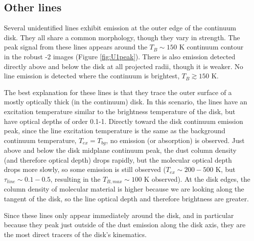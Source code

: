 \documentclass[twocolumn]{aastex61}
\begin{document}
\subsection{Other lines}
\label{sec:otherlines}
Several unidentified lines exhibit emission at the outer edge of the continuum disk.
They all share a common morphology, though they vary in strength.
The peak signal from these lines appears around the $T_B\sim150$ K continuum contour
in the robust -2 images
(Figure \ref{fig:U1peak}).
There is also emission detected directly above and below the disk at all projected
radii, though it is weaker.  No line emission is detected where the continuum is
brightest, $T_B\gtrsim150$ K.

The best explanation for these lines is that they trace the outer surface of a
mostly optically thick (in the continuum) disk.  In this scenario,
the lines have an excitation temperature similar to the brightness temperature
of the disk, but have optical depths of order 0.1-1.  
Directly toward the disk
continuum emission peak, since
the line excitation temperature is the same as the background continuum temperature,
$T_{ex}=T_{bg}$, no emission (or absorption) is observed.  Just above and below
the disk midplane continuum peak, the dust column density (and therefore
optical depth) drops rapidly, but the molecular optical depth drops more
slowly, so some emission is still
observed ($T_{ex}\sim200-500$ K, but $\tau_{line}\sim0.1-0.5$, resulting in 
the $T_{B,max} \sim 100$ K observed).  At the disk edges, the column density of
molecular material is higher because we are looking along the tangent of the
disk, so the line optical depth and therefore brightness are greater.

Since these lines only appear immediately around the disk, and in particular
because they peak just outside of the dust emission along the disk axis, they
are the most direct tracers of the disk's kinematics.

\end{document}
